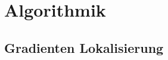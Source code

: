\chapter{Algorithmik}
\label{cha:algorithmik}

\section{Gradienten Lokalisierung}
\label{sec:gradient_localization}





